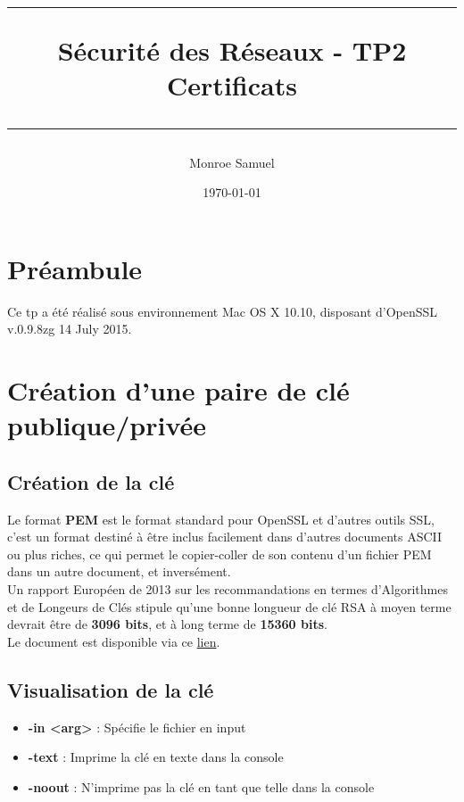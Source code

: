 \documentclass[a4paper,10pt,final,fleqn]{article}
\title{
\parbox{15cm}
{ %
  \vspace{3cm}
	\begin{center}\sf\bfseries\Huge
		\rule{15cm}{1pt}
		\medskip
		Sécurité des Réseaux - TP2 \\
		\huge Certificats
		\vspace{.5cm}
		\rule{15cm}{1pt}
	\end{center}
	\vspace{3cm}
 }}
\author{Monroe Samuel}
\date{\today}
\begin{document}
\maketitle
\newpage

	\section{Préambule}

		Ce tp a été réalisé sous environnement Mac OS X 10.10, disposant d'OpenSSL v.0.9.8zg 14 July 2015.\\

	\section{Création d'une paire de clé publique/privée}

		\subsection{Création de la clé}

			Le format \textbf{PEM} est le format standard pour OpenSSL et d'autres outils SSL, c'est un format destiné à être inclus facilement dans d'autres documents ASCII ou plus riches, ce qui permet le copier-coller de son contenu d'un fichier PEM dans un autre document, et inversément.\\

			Un rapport Européen de 2013 sur les recommandations en termes d'Algorithmes et de Longeurs de Clés stipule qu'une bonne longueur de clé RSA à moyen terme devrait être de \textbf{3096 bits}, et à long terme de \textbf{15360 bits}.\\
			Le document est disponible via ce \href{http://www.enisa.europa.eu/activities/identity-and-trust/library/deliverables/algorithms-key-sizes-and-parameters-report/at_download/fullReport}{lien}.\\

		\subsection{Visualisation de la clé}

			\begin{itemize}
				\item \textbf{-in <arg>} : Spécifie le fichier en input
				\item \textbf{-text} : Imprime la clé en texte dans la console
				\item \textbf{-noout} : N'imprime pas la clé en tant que telle dans la console
			\end{itemize}
\end{document}
